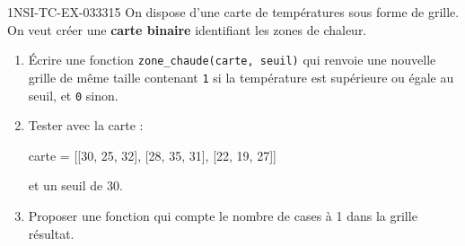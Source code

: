 \begin{exercice}{1NSI-TC-EX-033}{3}{15}
On dispose d'une carte de températures sous forme de grille. On veut créer une
\textbf{carte binaire} identifiant les zones de chaleur.

\begin{enumerate}
  \item Écrire une fonction \lstinline{zone_chaude(carte, seuil)} qui renvoie une
        nouvelle grille de même taille contenant \lstinline{1} si la température est
        supérieure ou égale au seuil, et \lstinline{0} sinon.
  \item Tester avec la carte :
\begin{python}
carte = [[30, 25, 32],
          [28, 35, 31],
          [22, 19, 27]]
\end{python}
        et un seuil de 30.
  \item Proposer une fonction qui compte le nombre de cases à 1 dans la grille
        résultat.
\end{enumerate}
\end{exercice}
